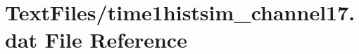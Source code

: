 \hypertarget{TextFiles_2time1histsim__channel17_8dat}{}\section{Text\+Files/time1histsim\+\_\+channel17.dat File Reference}
\label{TextFiles_2time1histsim__channel17_8dat}
